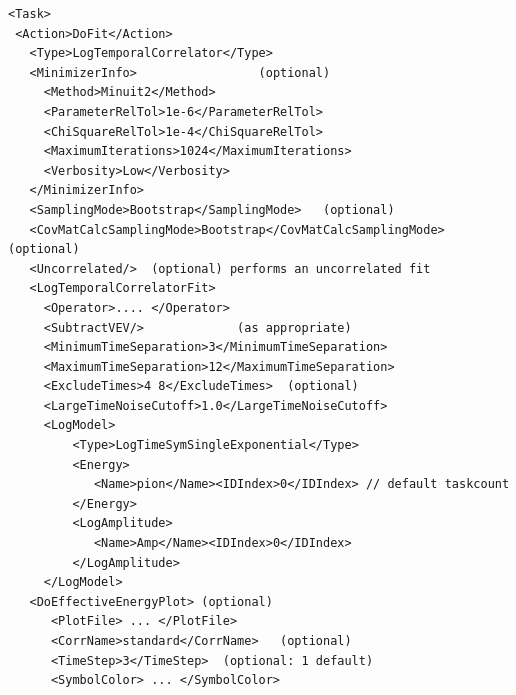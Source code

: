 \documentclass[12pt]{article}
\begin{document}
\begin{verbatim}                                                                         
<Task>                                                                   
 <Action>DoFit</Action>                                                  
   <Type>LogTemporalCorrelator</Type>                                    
   <MinimizerInfo>                 (optional)                            
     <Method>Minuit2</Method>                                            
     <ParameterRelTol>1e-6</ParameterRelTol>                             
     <ChiSquareRelTol>1e-4</ChiSquareRelTol>                             
     <MaximumIterations>1024</MaximumIterations>                         
     <Verbosity>Low</Verbosity>                                          
   </MinimizerInfo>                                                      
   <SamplingMode>Bootstrap</SamplingMode>   (optional)                   
   <CovMatCalcSamplingMode>Bootstrap</CovMatCalcSamplingMode> (optional) 
   <Uncorrelated/>  (optional) performs an uncorrelated fit              
   <LogTemporalCorrelatorFit>                                            
     <Operator>.... </Operator>                                          
     <SubtractVEV/>             (as appropriate)                         
     <MinimumTimeSeparation>3</MinimumTimeSeparation>                    
     <MaximumTimeSeparation>12</MaximumTimeSeparation>                   
     <ExcludeTimes>4 8</ExcludeTimes>  (optional)                        
     <LargeTimeNoiseCutoff>1.0</LargeTimeNoiseCutoff>                    
     <LogModel>                                                          
         <Type>LogTimeSymSingleExponential</Type>                        
         <Energy>                                                        
            <Name>pion</Name><IDIndex>0</IDIndex> // default taskcount   
         </Energy>                                                       
         <LogAmplitude>                                                  
            <Name>Amp</Name><IDIndex>0</IDIndex>                         
         </LogAmplitude>                                                 
     </LogModel>                                                         
   <DoEffectiveEnergyPlot> (optional)                                    
      <PlotFile> ... </PlotFile>                                         
      <CorrName>standard</CorrName>   (optional)                         
      <TimeStep>3</TimeStep>  (optional: 1 default)                      
      <SymbolColor> ... </SymbolColor>                                   

\end{verbatim}
\end{document}
